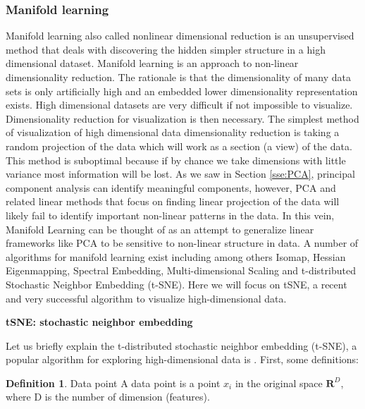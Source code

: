 \documentclass[11pt]{article}
\theoremstyle{definition}
\newtheorem{definition}{Definition}[section]
\theoremstyle{remark}
\begin{document}
\subsubsection{Manifold learning}
\label{sse:manifold}
Manifold learning also called nonlinear dimensional reduction is an unsupervised method that deals with discovering the hidden simpler structure in a high dimensional dataset.
Manifold learning is an approach to non-linear dimensionality reduction. The rationale is that the dimensionality of many data sets is only artificially high and an embedded lower dimensionality representation exists. High dimensional datasets are very difficult if not impossible to visualize. Dimensionality reduction for visualization is then necessary. The simplest method of visualization of high dimensional data  dimensionality reduction is taking a random projection of the data which will work as a section (a view) of the data. This method is  suboptimal because if by chance we take dimensions with little variance most information will be lost. 
As we saw in Section \ref{sse:PCA}, principal component analysis can identify meaningful components, however, PCA and related linear methods that focus on finding linear projection of the data will likely fail to identify important non-linear patterns in the data. 
In this vein, Manifold Learning can be thought of as an attempt to generalize linear frameworks like PCA to be sensitive to non-linear structure in data. 
A number of algorithms for manifold learning exist including among others Isomap, Hessian Eigenmapping, Spectral Embedding, Multi-dimensional Scaling and t-distributed Stochastic Neighbor Embedding (t-SNE). Here we will focus on tSNE, a recent and very successful algorithm to visualize high-dimensional data.

\textbf{tSNE: stochastic neighbor embedding}

Let us briefly explain the t-distributed stochastic neighbor embedding (t-SNE), a popular algorithm for exploring high-dimensional data is  \cite{maaten2008visualizing}. First, some definitions:

\theoremstyle{definition}
\begin{definition}{Data point}
A data point is a point $x_i$ in the original space $\mathbf{R}^D$, where D is the number of dimension (features).
\end{definition}
\end{document}

